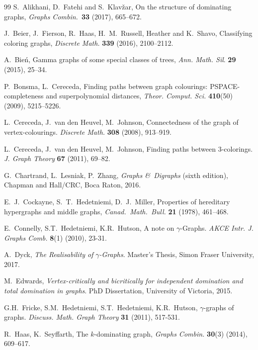 \documentclass[12pt]{article}%
\begin{document}
\begin{thebibliography}{99}                                                                                               %
S.~Alikhani, D.~Fatehi and S.~Klav\v{z}ar, On the structure
of dominating graphs, \emph{Graphs Combin.}\ \textbf{33} (2017), 665--672.

J.~Beier, J.~Fierson, R.~Haas, H.~M.~Russell, Heather and
K.~Shavo, Classifying coloring graphs,\emph{ Discrete Math.} \textbf{339}
(2016), 2100--2112.

A.~Bie\'{n}, Gamma graphs of some special classes of trees,
\emph{Ann. Math. Sil}. \textbf{29} (2015), 25--34.

P.~Bonsma, L.~Cereceda, Finding paths between graph colourings:
PSPACE-completeness and superpolynomial distances, \emph{Theor. Comput. Sci.}
\textbf{410}(50) (2009), 5215--5226.

L.~Cereceda, J.~van den Heuvel, M.~Johnson, Connectedness of
the graph of vertex-colourings. \emph{Discrete Math.} \textbf{308} (2008), 913--919.

L.~Cereceda, J.~van den Heuvel, M.~Johnson, Finding paths
between 3-colorings. \emph{J. Graph Theory} \textbf{67} (2011), 69--82.

G.~Chartrand, L.~Lesniak, P.~Zhang, \emph{Graphs \&\ Digraphs
}(sixth edition), Chapman and Hall/CRC, Boca Raton, 2016.

E.~J.~Cockayne, S.~T.~Hedetniemi, D.~J.~Miller, Properties of
hereditary hypergraphs and middle graphs, \emph{Canad.~Math.~Bull.}
\textbf{21} (1978), 461--468.

E.~Connelly, S.T.~Hedetniemi, K.R.~Hutson, A note on $\gamma
$-Graphs. \emph{AKCE Intr. J. Graphs Comb.} \textbf{8}(1) (2010), 23-31.

A.~Dyck, \emph{The Realisability of }$\gamma$\emph{-Graphs}.
Master's Thesis, Simon Fraser University, 2017.

M.~Edwards, \emph{Vertex-critically and bicritically for
independent domination and total domination in graphs}. PhD Dissertation,
University of Victoria, 2015.

G.H.~Fricke, S.M.~Hedetniemi, S.T.~Hedetniemi, K.R.~Hutson,
$\gamma$-graphs of graphs. \emph{Discuss. Math. Graph Theory} \textbf{31}
(2011), 517-531.

R.~Haas, K.~Seyffarth, The $k$-dominating graph, \emph{Graphs
Combin.} \textbf{30}(3) (2014), 609--617.


\end{thebibliography}
\end{document}
